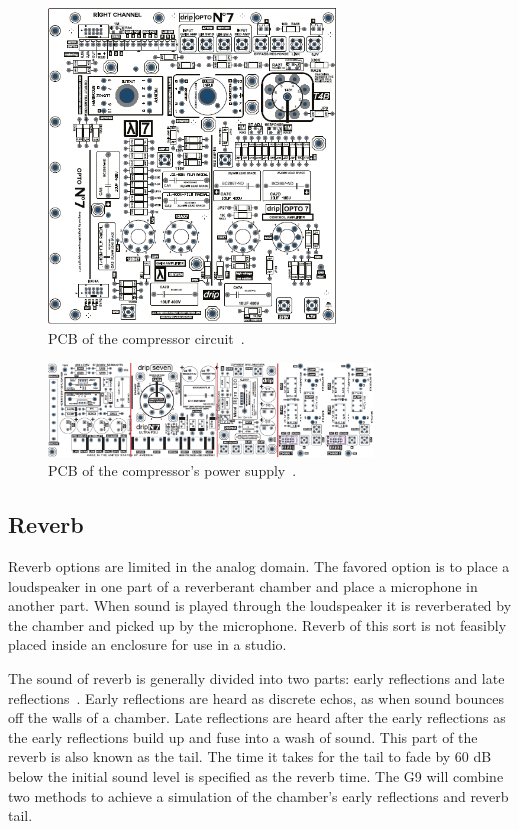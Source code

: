 \documentclass[journal]{IEEEtran}
\begin{document}
	
	\begin{figure}
		\centering
		\includegraphics[width=3in]{opto7pcb}
		\caption{PCB of the compressor circuit~\cite{opto7}. }
		\label{fig:opto7pcb}
	\end{figure}

	\begin{figure}
		\centering
		\includegraphics[width=3.4in]{opto7powerpcb}
		\caption{PCB of the compressor's power supply~\cite{opto7}. }
		\label{fig:opto7powerpcb}
	\end{figure}
	

	
	\subsection{Reverb}
	Reverb options are limited in the analog domain. The favored option is to place a loudspeaker in one part of a reverberant chamber and place a microphone in another part. When sound is played through the loudspeaker it is reverberated by the chamber and picked up by the microphone. Reverb of this sort is not feasibly placed inside an enclosure for use in a studio. 
	
	The sound of reverb is generally divided into two parts: early reflections and late reflections~\cite{earlyReflections}. Early reflections are heard as discrete echos, as when sound bounces off the walls of a chamber. Late reflections are heard after the early reflections as the early reflections build up and fuse into a wash of sound. This part of the reverb is also known as the tail. The time it takes for the tail to fade by 60 dB below the initial sound level is specified as the reverb time. The G9 will combine two methods to achieve a simulation of the chamber's early reflections and reverb tail.
	
\end{document}

